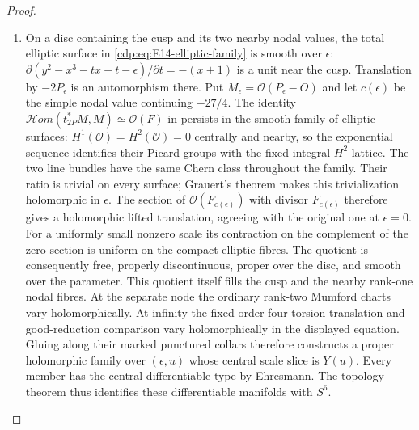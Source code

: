 \begin{proof}
\begin{enumerate}[label=\arabic*.,leftmargin=*]
\item On a disc containing the cusp
and its two nearby nodal values, the total elliptic surface in
\eqref{cdp:eq:E14-elliptic-family} is smooth over $\epsilon$:
$\partial(y^2-x^3-tx-t-\epsilon)/\partial t=-(x+1)$ is a unit
near the cusp. Translation by $-2P_\epsilon$ is an automorphism
there. Put $M_\epsilon=\mathcal O(P_\epsilon-O)$ and let $c(\epsilon)$
be the simple nodal value continuing $-27/4$. The identity
$\mathcal Hom(t_{2P}^*M,M)\simeq\mathcal O(F)$ in
\cite[Proposition~2.1]{LiuRollenske2026} persists in the smooth family
of elliptic surfaces: $H^1(\mathcal O)=H^2(\mathcal O)=0$ centrally
and nearby, so the exponential sequence identifies their Picard
groups with the fixed integral $H^2$ lattice. The two line bundles
have the same Chern class throughout the family. Their ratio is
trivial on every surface; Grauert's theorem makes this trivialization
holomorphic in $\epsilon$. The section of $\mathcal O(F_{c(\epsilon)})$
with divisor $F_{c(\epsilon)}$ therefore gives a holomorphic lifted
translation, agreeing with the original one at $\epsilon=0$.
For a uniformly small nonzero scale its contraction on the
complement of the zero section is uniform on the compact elliptic
fibres. The quotient is consequently free, properly discontinuous,
proper over the disc, and smooth over the parameter. This quotient
itself fills the cusp and the nearby rank-one nodal fibres. At the
separate node the ordinary rank-two Mumford charts vary
holomorphically. At infinity the fixed order-four torsion translation
and good-reduction comparison vary holomorphically in the displayed
equation. Gluing along their marked punctured collars therefore
constructs a proper holomorphic family over $(\epsilon,u)$ whose
central scale slice is $Y(u)$. Every member has the central
differentiable type by Ehresmann. The topology theorem
\cite[Theorem~5.1]{LiuRollenske2026} thus
identifies these differentiable manifolds with $S^6$.


\end{enumerate}
\end{proof}
